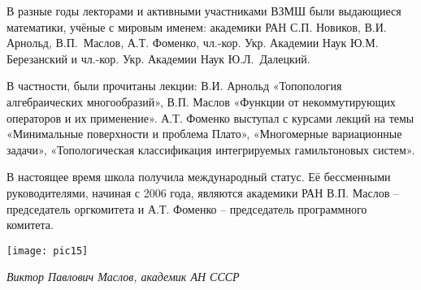 В разные годы лекторами и активными участниками ВЗМШ были выдающиеся математики, учёные с мировым именем: академики РАН С.П. Новиков, В.И. Арнольд, В.П.~Маслов, А.Т. Фоменко, чл.-кор. Укр. Академии Наук Ю.М. Березанский и чл.-кор. Укр. Академии Наук Ю.Л.~Далецкий.

В частности, были прочитаны лекции: В.И. Арнольд «Топопология алгебраических многообразий», В.П. Маслов «Функции от некоммутирующих операторов и их применение». А.Т. Фоменко выступал с курсами лекций на темы «Минимальные поверхности и проблема Плато», «Многомерные вариационные задачи», «Топологическая классификация интегрируемых гамильтоновых систем».

В настоящее время школа получила международный статус.  Её бессменными руководителями, начиная с 2006 года, являются академики РАН В.П. Маслов – председатель оргкомитета и А.Т. Фоменко – председатель программного комитета.

\begin{center}

\texttt{[image: pic15]}


{\it Виктор Павлович Маслов, академик АН СССР}
\end{center}

